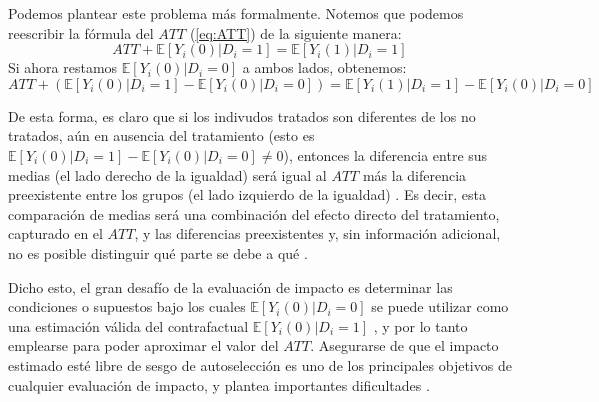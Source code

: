 \documentclass[../../main.tex]{subfiles}
\begin{document}
Podemos plantear este problema más formalmente. Notemos que podemos reescribir la fórmula
del \(ATT\) (\ref{eq:ATT}) de la siguiente manera:
\begin{equation}
    ATT + \mathbb{E} \left[Y_i(0)|D_i=1\right] = \mathbb{E} \left[Y_i(1)|D_i=1\right]
    \label{eq:ATT2}
\end{equation}
Si ahora restamos \(\mathbb{E} \left[Y_i(0)|D_i=0\right]\) a ambos lados, obtenemos:
\begin{equation}
    ATT + \left( \mathbb{E} \left[Y_i(0)|D_i=1\right] - \mathbb{E} \left[Y_i(0)|D_i=0\right] \right) =
    \mathbb{E} \left[Y_i(1)|D_i=1\right] - \mathbb{E} \left[Y_i(0)|D_i=0\right]\
    \label{eq:ATT3}
\end{equation}

De esta forma, es claro que si los indivudos tratados son diferentes de los no tratados,
aún en ausencia del tratamiento (esto es \(\mathbb{E} \left[Y_i(0)|D_i=1\right] -
\mathbb{E} \left[Y_i(0)|D_i=0\right] \neq 0\)), entonces la diferencia entre sus medias
(el lado derecho de la igualdad) será igual al \(ATT\) más la diferencia preexistente
entre los grupos (el lado izquierdo de la igualdad) \cite{bernal}. Es decir, esta
comparación de medias será una combinación del efecto directo del tratamiento, capturado
en el \(ATT\), y las diferencias preexistentes y, sin información adicional, no es posible
distinguir qué parte se debe a qué \cite{bernal}.

Dicho esto, el gran desafío de la evaluación de impacto es determinar las condiciones o
supuestos bajo los cuales \(\mathbb{E} \left[Y_i(0)|D_i=0\right]\) se puede utilizar como
una estimación válida del contrafactual \(\mathbb{E} \left[Y_i(0)|D_i=1\right]\)
\cite{bernal}, y por lo tanto emplearse para poder aproximar el valor del \(ATT\).
Asegurarse de que el impacto estimado esté libre de sesgo de autoselección es uno de los
principales objetivos de cualquier evaluación de impacto, y plantea importantes
dificultades \cite{gertler-2016}.
\end{document}
